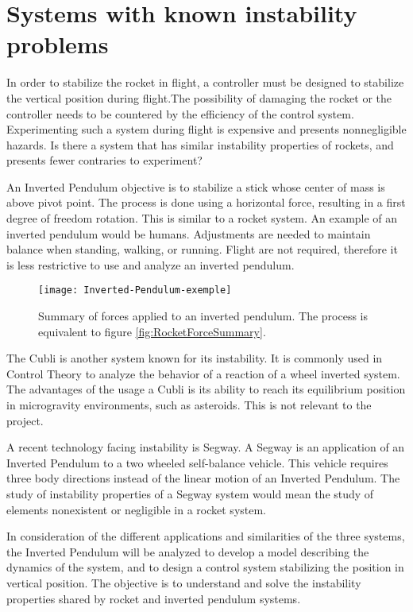 \section{Systems with known instability problems}

In order to stabilize the rocket in flight, a controller must be designed to stabilize the vertical position during flight.The possibility of damaging the rocket or the controller needs to be countered by the efficiency of the control system. Experimenting such a system during flight is expensive and presents nonnegligible hazards.
Is there a system that has similar instability properties of rockets, and presents fewer contraries to experiment?

An Inverted Pendulum objective is to stabilize a stick whose center of mass is above pivot point. The process is done using a horizontal force, resulting in a first degree of freedom rotation. This is similar to a rocket system. An example of an inverted pendulum would be humans. Adjustments are needed to maintain balance when standing, walking, or running. Flight are not required, therefore it is less restrictive to use and analyze an inverted pendulum.

\begin{figure}[htbp]
	\centering
	\texttt{[image: Inverted-Pendulum-exemple]}
	\caption{Summary of forces applied to an inverted pendulum. The process is equivalent to figure  \vref{fig:RocketForceSummary}.}
	\label{fig:InvertedPendulum}
\end{figure}


The Cubli is another system known for its instability. It is commonly used in Control Theory to analyze the behavior of a reaction of a wheel inverted system. The advantages of the usage a Cubli is its ability to reach its equilibrium position in microgravity environments, such as asteroids. This is not relevant to the project.

A recent technology facing instability is Segway. A Segway is an application of an Inverted Pendulum to a two wheeled self-balance vehicle. This vehicle requires three body directions instead of the linear motion of an Inverted Pendulum. The study of instability properties of a Segway system would mean the study of elements nonexistent or negligible in a rocket system.

In consideration of the different applications and similarities of the three systems, the Inverted Pendulum will be analyzed to develop a model describing the dynamics of the system, and to design a control system stabilizing the position in vertical position. The objective is to understand and solve the instability properties shared by rocket and inverted pendulum systems.


